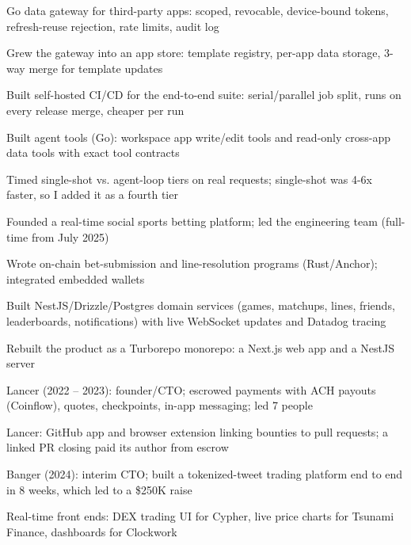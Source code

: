 \documentclass[print]{jack-resume}
\begin{document}
\begin{tightemize}
    \item Go data gateway for third-party apps: scoped, revocable, device-bound tokens, refresh-reuse rejection, rate limits, audit log
    \item Grew the gateway into an app store: template registry, per-app data storage, 3-way merge for template updates
    \item Built self-hosted CI/CD for the end-to-end suite: serial/parallel job split, runs on every release merge, cheaper per run
    \item Built agent tools (Go): workspace app write/edit tools and read-only cross-app data tools with exact tool contracts
    \item Timed single-shot vs. agent-loop tiers on real requests; single-shot was 4-6x faster, so I added it as a fourth tier
\end{tightemize}
\sectionsep

\begin{tightemize}
    \item Founded a real-time social sports betting platform; led the engineering team (full-time from July 2025)
    \item Wrote on-chain bet-submission and line-resolution programs (Rust/Anchor); integrated embedded wallets
    \item Built NestJS/Drizzle/Postgres domain services (games, matchups, lines, friends, leaderboards, notifications) with live WebSocket updates and Datadog tracing
    \item Rebuilt the product as a Turborepo monorepo: a Next.js web app and a NestJS server
\end{tightemize}
\sectionsep

\begin{tightemize}
    \item Lancer (2022 -- 2023): founder/CTO; escrowed payments with ACH payouts (Coinflow), quotes, checkpoints, in-app messaging; led 7 people
    \item Lancer: GitHub app and browser extension linking bounties to pull requests; a linked PR closing paid its author from escrow
    \item Banger (2024): interim CTO; built a tokenized-tweet trading platform end to end in 8 weeks, which led to a \$250K raise
    \item Real-time front ends: DEX trading UI for Cypher, live price charts for Tsunami Finance, dashboards for Clockwork
\end{tightemize}
\sectionsep
\end{document}
